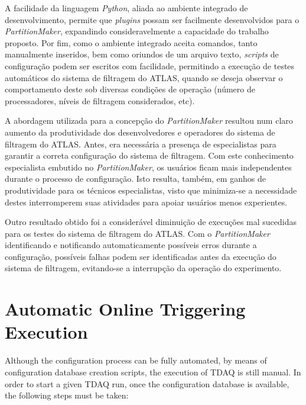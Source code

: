 A facilidade da linguagem \emph{Python}, aliada ao ambiente integrado de desenvolvimento, permite que \emph{plugins} possam ser facilmente desenvolvidos para o \emph{PartitionMaker},  expandindo consideravelmente a capacidade do trabalho proposto. Por fim, como o ambiente integrado aceita comandos, tanto manualmente inseridos, bem como oriundos de um arquivo texto, \emph{scripts} de configuração podem ser escritos com facilidade, permitindo a execução de testes automáticos do sistema de filtragem do ATLAS, quando se deseja observar o comportamento deste sob diversas condições de operação (número de processadores, níveis de filtragem considerados, etc).

A abordagem utilizada para a concepção do \emph{PartitionMaker} resultou num claro aumento da produtividade dos desenvolvedores e operadores do sistema de filtragem do ATLAS. Antes, era necessária a presença de especialistas para garantir a correta configuração do sistema de filtragem. Com este conhecimento especialista embutido no \emph{PartitionMaker}, os usuários ficam mais independentes durante o processo de configuração. Isto resulta, também, em ganhos de produtividade para os técnicos especialistas, visto que minimiza-se a necessidade destes interromperem suas atividades para apoiar usuários menos experientes.

Outro resultado obtido foi a considerável diminuição de execuções mal sucedidas para os testes do sistema de filtragem do ATLAS. Com o \emph{PartitionMaker} identificando e notificando automaticamente possíveis erros durante a configuração, possíveis falhas podem ser identificadas antes da execução do sistema de filtragem, evitando-se a interrupção da operação do experimento.


\section{Automatic Online Triggering Execution}
\label{sec:runner}

Although the configuration process can be fully automated, by means of configuration database creation scripts, the execution of TDAQ is still manual. In order to start a given TDAQ run, once the configuration database is available, the following steps must be taken:

